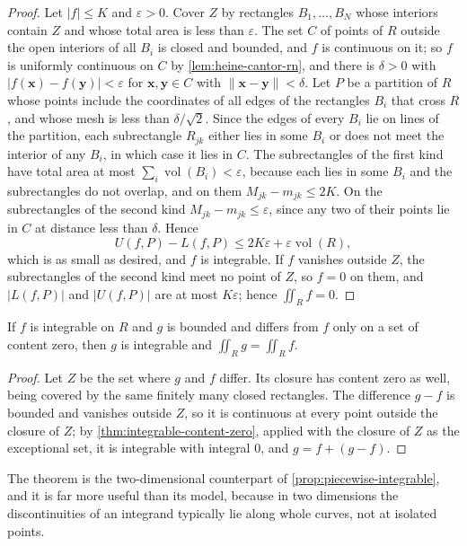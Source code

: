 \begin{proof}
Let $|f|\le K$ and $\varepsilon>0$. Cover $Z$ by rectangles $B_1,\ldots,B_N$ whose interiors contain $Z$ and whose total area is less than $\varepsilon$. The set $C$ of points of $R$ outside the open interiors of all $B_i$ is closed and bounded, and $f$ is continuous on it; so $f$ is uniformly continuous on $C$ by \cref{lem:heine-cantor-rn}, and there is $\delta>0$ with $|f(\mathbf x)-f(\mathbf y)|<\varepsilon$ for $\mathbf x,\mathbf y\in C$ with $\|\mathbf x-\mathbf y\|<\delta$. Let $P$ be a partition of $R$ whose points include the coordinates of all edges of the rectangles $B_i$ that cross $R$, and whose mesh is less than $\delta/\sqrt2$. Since the edges of every $B_i$ lie on lines of the partition, each subrectangle $R_{jk}$ either lies in some $B_i$ or does not meet the interior of any $B_i$, in which case it lies in $C$. The subrectangles of the first kind have total area at most $\sum_i\operatorname{vol}(B_i)<\varepsilon$, because each lies in some $B_i$ and the subrectangles do not overlap, and on them $M_{jk}-m_{jk}\le2K$. On the subrectangles of the second kind $M_{jk}-m_{jk}\le\varepsilon$, since any two of their points lie in $C$ at distance less than $\delta$. Hence
\[
U(f,P)-L(f,P)\le2K\varepsilon+\varepsilon\operatorname{vol}(R),
\]
which is as small as desired, and $f$ is integrable. If $f$ vanishes outside $Z$, the subrectangles of the second kind meet no point of $Z$, so $f=0$ on them, and $|L(f,P)|$ and $|U(f,P)|$ are at most $K\varepsilon$; hence $\iint_Rf=0$.
\end{proof}

\begin{corollary}
\label{cor:change-content-zero}
If $f$ is integrable on $R$ and $g$ is bounded and differs from $f$ only on a set of content zero, then $g$ is integrable and $\iint_Rg=\iint_Rf$.
\end{corollary}

\begin{proof}
Let $Z$ be the set where $g$ and $f$ differ. Its closure has content zero as well, being covered by the same finitely many closed rectangles. The difference $g-f$ is bounded and vanishes outside $Z$, so it is continuous at every point outside the closure of $Z$; by \cref{thm:integrable-content-zero}, applied with the closure of $Z$ as the exceptional set, it is integrable with integral $0$, and $g=f+(g-f)$.
\end{proof}

The theorem is the two-dimensional counterpart of \cref{prop:piecewise-integrable}, and it is far more useful than its model, because in two dimensions the discontinuities of an integrand typically lie along whole curves, not at isolated points.

